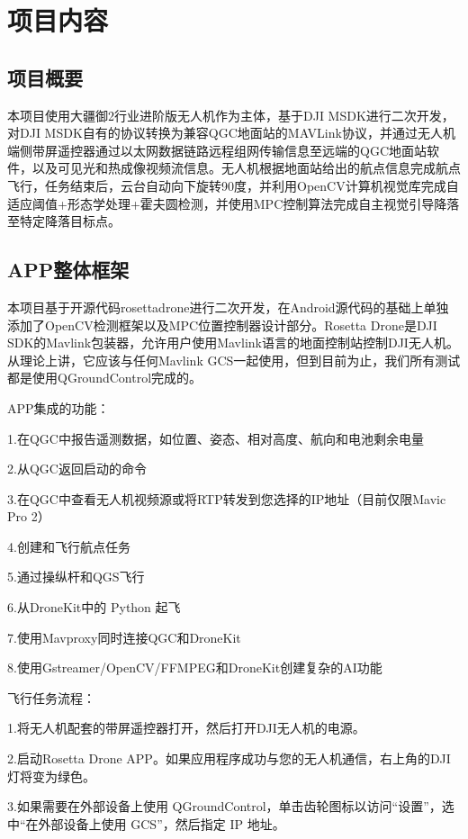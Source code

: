 \chapter{项目内容}

\section{项目概要}

本项目使用大疆御2行业进阶版无人机作为主体，基于DJI MSDK进行二次开发，对DJI MSDK自有的协议转换为兼容QGC地面站的MAVLink协议，并通过无人机端侧带屏遥控器通过以太网数据链路远程组网传输信息至远端的QGC地面站软件，以及可见光和热成像视频流信息。无人机根据地面站给出的航点信息完成航点飞行，任务结束后，云台自动向下旋转90度，并利用OpenCV计算机视觉库完成自适应阈值+形态学处理+霍夫圆检测，并使用MPC控制算法完成自主视觉引导降落至特定降落目标点。

\section{APP整体框架}

本项目基于开源代码rosettadrone进行二次开发，在Android源代码的基础上单独添加了OpenCV检测框架以及MPC位置控制器设计部分。Rosetta Drone是DJI SDK的Mavlink包装器，允许用户使用Mavlink语言的地面控制站控制DJI无人机。从理论上讲，它应该与任何Mavlink GCS一起使用，但到目前为止，我们所有测试都是使用QGroundControl完成的。

APP集成的功能：

1.在QGC中报告遥测数据，如位置、姿态、相对高度、航向和电池剩余电量

2.从QGC返回启动的命令

3.在QGC中查看无人机视频源或将RTP转发到您选择的IP地址（目前仅限Mavic Pro 2）

4.创建和飞行航点任务

5.通过操纵杆和QGS飞行

6.从DroneKit中的 Python 起飞

7.使用Mavproxy同时连接QGC和DroneKit

8.使用Gstreamer/OpenCV/FFMPEG和DroneKit创建复杂的AI功能

飞行任务流程：

1.将无人机配套的带屏遥控器打开，然后打开DJI无人机的电源。

2.启动Rosetta Drone APP。如果应用程序成功与您的无人机通信，右上角的DJI灯将变为绿色。

3.如果需要在外部设备上使用 QGroundControl，单击齿轮图标以访问“设置”，选中“在外部设备上使用 GCS”，然后指定 IP 地址。

